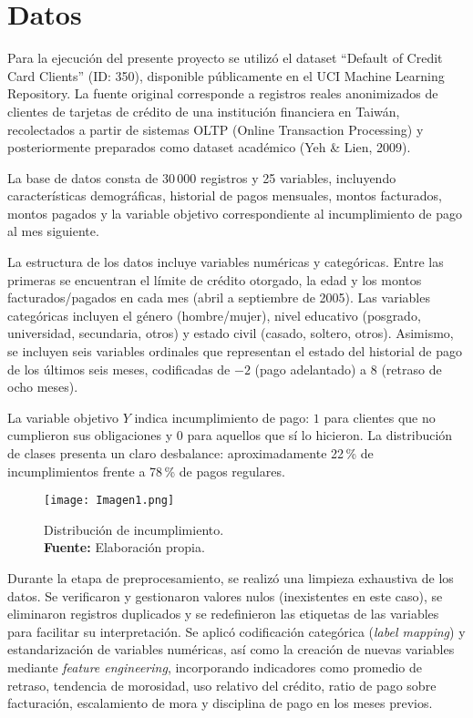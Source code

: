 \documentclass[journal]{apa7}
\begin{document}
\section{Datos}

Para la ejecución del presente proyecto se utilizó el dataset \enquote{Default of Credit Card Clients} (ID: 350), disponible públicamente en el UCI Machine Learning Repository. La fuente original corresponde a registros reales anonimizados de clientes de tarjetas de crédito de una institución financiera en Taiwán, recolectados a partir de sistemas OLTP (Online Transaction Processing) y posteriormente preparados como dataset académico (Yeh \& Lien, 2009).

La base de datos consta de 30\,000 registros y 25 variables, incluyendo características demográficas, historial de pagos mensuales, montos facturados, montos pagados y la variable objetivo correspondiente al incumplimiento de pago al mes siguiente.

La estructura de los datos incluye variables numéricas y categóricas. Entre las primeras se encuentran el límite de crédito otorgado, la edad y los montos facturados/pagados en cada mes (abril a septiembre de 2005). Las variables categóricas incluyen el género (hombre/mujer), nivel educativo (posgrado, universidad, secundaria, otros) y estado civil (casado, soltero, otros). Asimismo, se incluyen seis variables ordinales que representan el estado del historial de pago de los últimos seis meses, codificadas de \(-2\) (pago adelantado) a \(8\) (retraso de ocho meses). 

La variable objetivo \(Y\) indica incumplimiento de pago: \(1\) para clientes que no cumplieron sus obligaciones y \(0\) para aquellos que sí lo hicieron. La distribución de clases presenta un claro desbalance: aproximadamente 22\,\% de incumplimientos frente a 78\,\% de pagos regulares.

\begin{figure}[ht]
  \centering
  \texttt{[image: Imagen1.png]}
 \caption{Distribución de incumplimiento. \\ \textbf{Fuente:} Elaboración propia.}
  \label{fig:distribucion-incumplimiento}
\end{figure}

Durante la etapa de preprocesamiento, se realizó una limpieza exhaustiva de los datos. Se verificaron y gestionaron valores nulos (inexistentes en este caso), se eliminaron registros duplicados y se redefinieron las etiquetas de las variables para facilitar su interpretación. Se aplicó codificación categórica (\emph{label mapping}) y estandarización de variables numéricas, así como la creación de nuevas variables mediante \emph{feature engineering}, incorporando indicadores como promedio de retraso, tendencia de morosidad, uso relativo del crédito, ratio de pago sobre facturación, escalamiento de mora y disciplina de pago en los meses previos.
\end{document}
